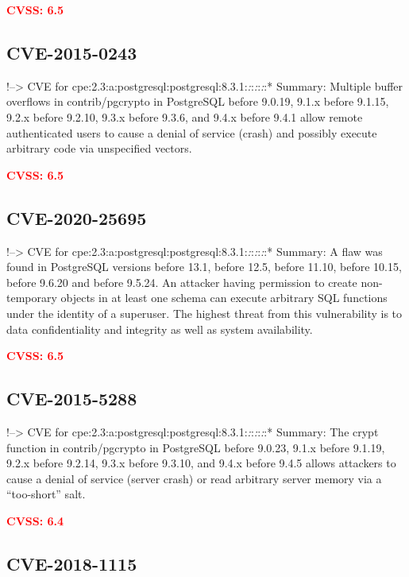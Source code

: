\documentclass[a4paper, 12pt]{article}
\begin{document}
\textbf{\textcolor{red}{CVSS: 6.5}}

\hypertarget{cve-2015-0243}{%
\subsection{CVE-2015-0243}\label{cve-2015-0243}}

!--\textgreater{} CVE for
cpe:2.3:a:postgresql:postgresql:8.3.1:\emph{:}:\emph{:}:\emph{:}:*
Summary: Multiple buffer overflows in contrib/pgcrypto in PostgreSQL
before 9.0.19, 9.1.x before 9.1.15, 9.2.x before 9.2.10, 9.3.x before
9.3.6, and 9.4.x before 9.4.1 allow remote authenticated users to cause
a denial of service (crash) and possibly execute arbitrary code via
unspecified vectors.

\textbf{\textcolor{red}{CVSS: 6.5}}

\hypertarget{cve-2020-25695}{%
\subsection{CVE-2020-25695}\label{cve-2020-25695}}

!--\textgreater{} CVE for
cpe:2.3:a:postgresql:postgresql:8.3.1:\emph{:}:\emph{:}:\emph{:}:*
Summary: A flaw was found in PostgreSQL versions before 13.1, before
12.5, before 11.10, before 10.15, before 9.6.20 and before 9.5.24. An
attacker having permission to create non-temporary objects in at least
one schema can execute arbitrary SQL functions under the identity of a
superuser. The highest threat from this vulnerability is to data
confidentiality and integrity as well as system availability.

\textbf{\textcolor{red}{CVSS: 6.5}}

\hypertarget{cve-2015-5288}{%
\subsection{CVE-2015-5288}\label{cve-2015-5288}}

!--\textgreater{} CVE for
cpe:2.3:a:postgresql:postgresql:8.3.1:\emph{:}:\emph{:}:\emph{:}:*
Summary: The crypt function in contrib/pgcrypto in PostgreSQL before
9.0.23, 9.1.x before 9.1.19, 9.2.x before 9.2.14, 9.3.x before 9.3.10,
and 9.4.x before 9.4.5 allows attackers to cause a denial of service
(server crash) or read arbitrary server memory via a ``too-short'' salt.

\textbf{\textcolor{red}{CVSS: 6.4}}

\hypertarget{cve-2018-1115}{%
\subsection{CVE-2018-1115}\label{cve-2018-1115}}
\end{document}
